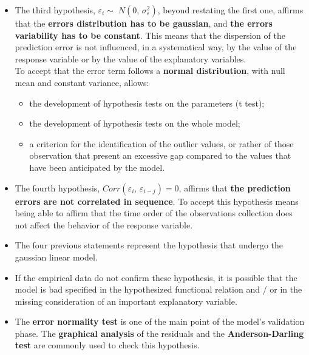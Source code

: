 \begin{frame}
  \vspace*{.5cm}
  \begin{itemize}
  \item The third hypothesis, {\boldmath $ \varepsilon_i \sim\; N(0,\,\sigma^2_\varepsilon) $}, beyond restating the first one, affirms that the \textbf{errors distribution has to be gaussian}, and \textbf{the errors variability has to be constant}. This means that the dispersion of the prediction error is not influenced, in a systematical way, by the value of the response variable or by the value of the explanatory variables. \\ To accept that the error term follows a \textbf{normal distribution}, with null mean and constant variance, allows:
  \begin{itemize}
    \item the development of hypothesis tests on the parameters (t test);
    \item the development of hypothesis tests on the whole model;
    \item a criterion for the identification of the outlier values, or rather of those observation that present an excessive gap compared to the values that have been anticipated by the model.
  \end{itemize}
  \vspace*{.25cm}
  \end{itemize}
\end{frame}

\begin{frame}
  \vspace*{.25cm}
  \begin{itemize}
    \item The fourth hypothesis, {\boldmath $ Corr(\varepsilon_{i},\,\varepsilon_{i-j}) = 0 $}, affirms that \textbf{the prediction errors are not correlated in sequence}. To accept this hypothesis means being able to affirm that the time order of the observations collection does not affect the behavior of the response variable. 
    \item The four previous statements represent the hypothesis that undergo the gaussian linear model. 
    \item If the empirical data do not confirm these hypothesis, it is possible that the model is bad specified in the hypothesized functional relation and / or in the missing consideration of an important explanatory variable.
    \item The \textbf{error normality test} is one of the main point of the model's validation phase. The \textbf{graphical analysis} of the residuals and the \textbf{Anderson-Darling test} are commonly used to check this hypothesis.
  \end{itemize}
\end{frame}

